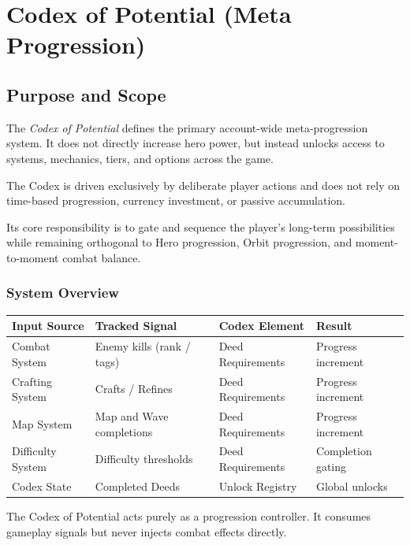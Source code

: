 \section{Codex of Potential (Meta Progression)}

\subsection{Purpose and Scope}

The \emph{Codex of Potential} defines the primary account-wide meta-progression system.
It does not directly increase hero power, but instead unlocks access to systems, mechanics,
tiers, and options across the game.

The Codex is driven exclusively by deliberate player actions and does not rely on time-based
progression, currency investment, or passive accumulation.

Its core responsibility is to gate and sequence the player's long-term possibilities
while remaining orthogonal to Hero progression, Orbit progression, and moment-to-moment combat balance.

\subsubsection{System Overview}

\begin{center}
	\begin{tabular}{|l|l|l|l|}
		\hline
		\textbf{Input Source} & \textbf{Tracked Signal} & \textbf{Codex Element} & \textbf{Result} \\
		\hline
		Combat System & Enemy kills (rank / tags) & Deed Requirements & Progress increment \\
		\hline
		Crafting System & Crafts / Refines & Deed Requirements & Progress increment \\
		\hline
		Map System & Map and Wave completions & Deed Requirements & Progress increment \\
		\hline
		Difficulty System & Difficulty thresholds & Deed Requirements & Completion gating \\
		\hline
		Codex State & Completed Deeds & Unlock Registry & Global unlocks \\
		\hline
	\end{tabular}
\end{center}

The Codex of Potential acts purely as a progression controller.
It consumes gameplay signals but never injects combat effects directly.

